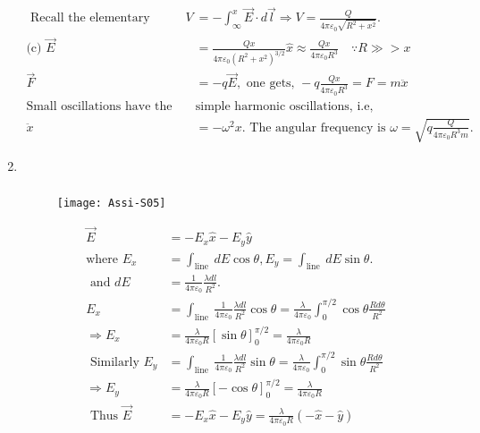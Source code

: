 \begin{enumerate}
\begin{answer}
\begin{align*}
\text{	Recall the elementary equations, }V&=-\int_{\infty}^{x} \vec{E} \cdot d \vec{l} \Rightarrow V=\frac{Q}{4 \pi \varepsilon_{0} \sqrt{R^{2}+x^{2}}}.\\
	\text{(c) }\vec{E}&=\frac{Q x}{4 \pi \varepsilon_{0}\left(R^{2}+x^{2}\right)^{3 / 2}} \hat{x} \approx \frac{Q x}{4 \pi \varepsilon_{0} R^{3}} \quad \because R \gg>x\\ \vec{F}&=-q \vec{E},\text{ one gets, }-q \frac{Q x}{4 \pi \varepsilon_{0} R^{3}}=F=m \ddot{x}\\
	\text{Small oscillations have the same form as }&\text{simple harmonic oscillations, i.e,} \\
	\ddot{x}&=-\omega^{2} x.\text{ The angular frequency is }\omega=\sqrt{q \frac{Q}{4 \pi \varepsilon_{0} R^{3} m}}.
	\end{align*}
\end{answer}
\item $\left. \right. $
\begin{answer}$\left. \right. $
		\begin{figure}[H]
		\centering
		\texttt{[image: Assi-S05]}
	\end{figure}
	\begin{align*}
	\vec{E}&=-E_{x} \hat{x}-E_{y} \hat{y}\\
	\text{where }E_{x}&=\int_{\text {line }} d E \cos \theta, E_{y}=\int_{\text {line }} d E \sin \theta.\\
\text{	and }d E&=\frac{1}{4 \pi \varepsilon_{0}} \frac{\lambda d l}{R^{2}}.\\
	E_{x}&=\int_{\text {line }} \frac{1}{4 \pi \varepsilon_{0}} \frac{\lambda d l}{R^{2}} \cos \theta=\frac{\lambda}{4 \pi \varepsilon_{0}} \int_{0}^{\pi / 2} \cos \theta \frac{R d \theta}{R^{2}} \\
	\Rightarrow E_{x}&=\frac{\lambda}{4 \pi \varepsilon_{0} R}[\sin \theta]_{0}^{\pi / 2}=\frac{\lambda}{4 \pi \varepsilon_{0} R} \\
	\text { Similarly } E_{y}&=\int_{\text {line }} \frac{1}{4 \pi \varepsilon_{0}} \frac{\lambda d l}{R^{2}} \sin \theta=\frac{\lambda}{4 \pi \varepsilon_{0}} \int_{0}^{\pi / 2} \sin \theta \frac{R d \theta}{R^{2}} \\
	\Rightarrow E_{y}&=\frac{\lambda}{4 \pi \varepsilon_{0} R}[-\cos \theta]_{0}^{\pi / 2}=\frac{\lambda}{4 \pi \varepsilon_{0} R} \\
	\text { Thus } \vec{E}&=-E_{x} \hat{x}-E_{y} \hat{y}=\frac{\lambda}{4 \pi \varepsilon_{0} R}(-\hat{x}-\hat{y})
	\end{align*}

\end{answer}
\end{enumerate}
